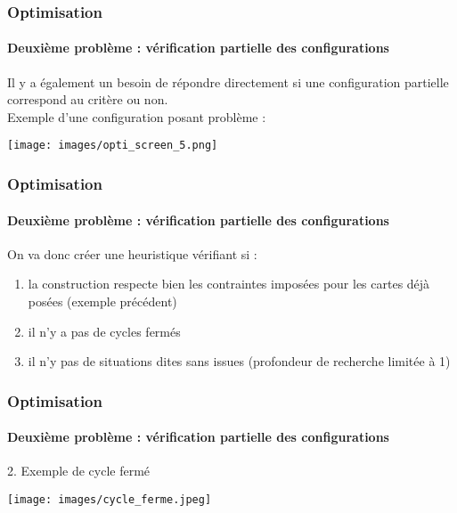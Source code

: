 \documentclass{beamer}
\begin{document}
\begin{frame}
	\frametitle{Optimisation}
	\framesubtitle{Deuxième problème : vérification partielle des configurations}

	Il y a également un besoin de répondre directement si une configuration partielle correspond au critère ou non. \\ 
	Exemple d'une configuration posant problème : 
	\begin{center}
		\texttt{[image: images/opti\_screen\_5.png]}
	\end{center}
\end{frame}
\begin{frame}
	\frametitle{Optimisation}
	\framesubtitle{Deuxième problème : vérification partielle des configurations}
	On va donc créer une heuristique vérifiant si : 
	\begin{enumerate}
		\item la construction respecte bien les contraintes imposées pour les cartes déjà posées (exemple précédent)
		\item il n'y a pas de cycles fermés
		\item il n'y pas de situations dites sans issues (profondeur de recherche limitée à 1)
	\end{enumerate}
\end{frame}

\begin{frame}
	\frametitle{Optimisation}
	\framesubtitle{Deuxième problème : vérification partielle des configurations}
	2. Exemple de cycle fermé
	\begin{center}
		\texttt{[image: images/cycle\_ferme.jpeg]}
	\end{center}
\end{frame}
\end{document}
